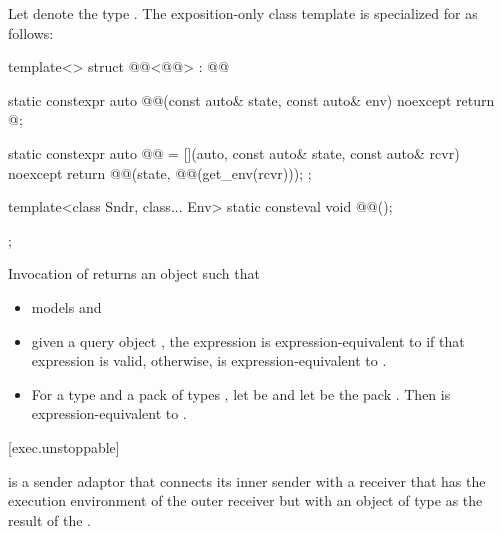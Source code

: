 \pnum
Let  denote the type .
The exposition-only class template 
is specialized for  as follows:
\begin{codeblock}
template<>
struct @@<@@> : @@ {
  static constexpr auto @@(const auto& state, const auto& env) noexcept {
    return @\seebelow@;
  }

  static constexpr auto @@ =
    [](auto, const auto& state, const auto& rcvr) noexcept {
      return @@(state, @@(get_env(rcvr)));
    };

  template<class Sndr, class... Env>
    static consteval void @@();
};
\end{codeblock}
Invocation of
returns an object  such that
\begin{itemize}
\item
{} models  and
\item
given a query object ,
the expression  is expression-equivalent
to  if that expression is valid,
otherwise,  is expression-equivalent
to .
\item
For a type  and a pack of types ,
let  be  and
let  be the pack
.
Then 
is expression-equivalent to
.
\end{itemize}

[exec.unstoppable]{}

\pnum
{} is a sender adaptor
that connects its inner sender
with a receiver that has the execution environment of the outer receiver
but with an object of type 
as the result of the .

